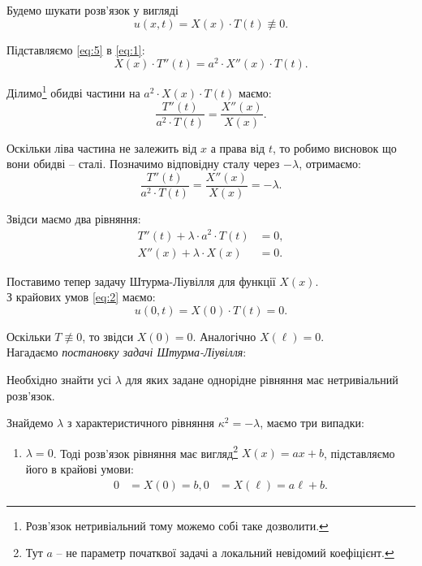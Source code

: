 \begin{solution}
	Будемо шукати розв'язок у вигляді
	\begin{equation}
		\label{eq:5}
		u(x, t) = X(x) \cdot T(t) \not\equiv 0.
	\end{equation}

	Підставляємо \eqref{eq:5} в \eqref{eq:1}:
	\begin{equation*}
		X(x) \cdot T''(t) = a^2 \cdot X''(x) \cdot T(t).
	\end{equation*}

	Ділимо\footnote{Розв'язок нетривіальний тому можемо собі таке дозволити.} обидві частини на $a^2 \cdot X(x) \cdot T(t)$ маємо:
	\begin{equation*}
		\frac{T''(t)}{a^2 \cdot T(t)} = \frac{X''(x)}{X(x)}.
	\end{equation*}

	Оскільки ліва частина не залежить від $x$ а права від $t$, то робимо висновок що вони обидві -- сталі. Позначимо відповідну сталу через $-\lambda$, отримаємо:
	\begin{equation*}
		\frac{T''(t)}{a^2 \cdot T(t)} = \frac{X''(x)}{X(x)} = - \lambda.
	\end{equation*}

	Звідси маємо два рівняння:
	\begin{align*}
		T''(t) + \lambda \cdot a^2 \cdot T(t) &= 0, \\
		X''(x) + \lambda \cdot X(x) &= 0.
	\end{align*}

	Поставимо тепер задачу Штурма-Ліувілля для функції $X(x)$. \\

	З крайових умов \eqref{eq:2} маємо:
	\begin{equation*}
		u(0, t) = X(0) \cdot T(t) = 0.
	\end{equation*}

	Оскільки $T \not\equiv 0$, то звідси $X(0) = 0$. Аналогічно $X(\ell) = 0$. \\

	Нагадаємо \textit{постановку задачі Штурма-Ліувілля}:

	\begin{problem*}
		Необхідно знайти усі $\lambda$ для яких задане однорідне рівняння має нетривіальний розв'язок.
	\end{problem*}

	Знайдемо $\lambda$ з характеристичного рівняння $\kappa^2 = - \lambda$, маємо три випадки:

	\begin{enumerate}
		\item $\lambda = 0$. Тоді розв'язок рівняння має вигляд\footnote{Тут $a$ -- не параметр початквої задачі а локальний невідомий коефіцієнт.} $X(x) = a x + b$, підставляємо його в крайові умови:
		\begin{align*}
			0 &= X(0) = b,
			0 &= X(\ell) = a \ell + b.
		\end{align*}


\end{enumerate}
\end{solution}
